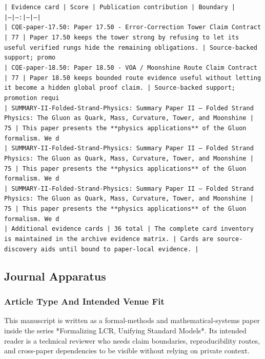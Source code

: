 \documentclass[11pt]{article}
\begin{document}
\noindent\texttt{| Evidence card | Score | Publication contribution | Boundary |}\\
\noindent\texttt{|---|---:|---|---|}\\
\noindent\texttt{| CQE-paper-17.50: Paper 17.50 - Error-Correction Tower Claim Contract | 77 | Paper 17.50 keeps the tower strong by refusing to let its useful verified rungs hide the remaining obligations. | Source-backed support; promo}\\
\noindent\texttt{| CQE-paper-18.50: Paper 18.50 - VOA / Moonshine Route Claim Contract | 77 | Paper 18.50 keeps bounded route evidence useful without letting it become a hidden global proof claim. | Source-backed support; promotion requi}\\
\noindent\texttt{| SUMMARY-II-Folded-Strand-Physics: Summary Paper II — Folded Strand Physics: The Gluon as Quark, Mass, Curvature, Tower, and Moonshine | 75 | This paper presents the **physics applications** of the Gluon formalism. We d}\\
\noindent\texttt{| SUMMARY-II-Folded-Strand-Physics: Summary Paper II — Folded Strand Physics: The Gluon as Quark, Mass, Curvature, Tower, and Moonshine | 75 | This paper presents the **physics applications** of the Gluon formalism. We d}\\
\noindent\texttt{| SUMMARY-II-Folded-Strand-Physics: Summary Paper II — Folded Strand Physics: The Gluon as Quark, Mass, Curvature, Tower, and Moonshine | 75 | This paper presents the **physics applications** of the Gluon formalism. We d}\\
\noindent\texttt{| Additional evidence cards | 36 total | The complete card inventory is maintained in the archive evidence matrix. | Cards are source-discovery aids until bound to paper-local evidence. |}\\

\subsection*{Journal Apparatus}

\subsubsection*{Article Type And Intended Venue Fit}

This manuscript is written as a formal-methods and mathematical-systems paper
inside the series *Formalizing LCR, Unifying Standard Models*. Its intended
reader is a technical reviewer who needs claim boundaries, reproducibility
routes, and cross-paper dependencies to be visible without relying on private
context.
\end{document}
